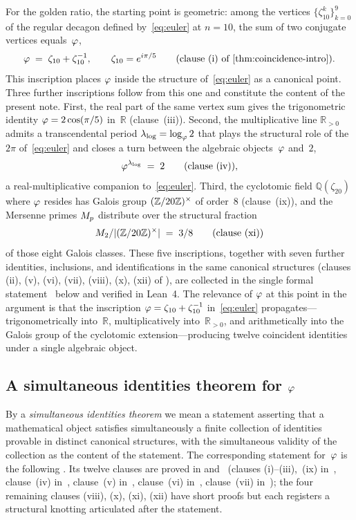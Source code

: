For the golden ratio, the starting point is geometric: among the
vertices $\{\zeta_{10}^{k}\}_{k=0}^{9}$ of the regular decagon
defined by~\eqref{eq:euler} at $n=10$, the sum of two conjugate
vertices equals~$\varphi$,
\[
  \golden \;=\; \zeta_{10}+\zeta_{10}^{-1}, \qquad \zeta_{10}=e^{i\pi/5}
  \qquad\text{(clause (i) of \Cref{thm:coincidence-intro})}.
\]
This inscription places $\varphi$ inside the structure
of~\eqref{eq:euler} as a canonical point.  Three further inscriptions
follow from this one and constitute the content of the present note.
First, the real part of the same vertex sum gives the trigonometric
identity $\varphi = 2\cos(\pi/5)$ in~$\mathbb{R}$ (clause~(iii)).
Second, the multiplicative line $\mathbb{R}_{>0}$ admits a
transcendental period $\lambda_{\log}=\log_{\varphi}2$ that plays the
structural role of the $2\pi$ of~\eqref{eq:euler} and closes a turn
between the algebraic objects~$\varphi$ and~$2$,
\[
  \varphi^{\lambda_{\log}} \;=\; 2 \qquad\text{(clause (iv))},
\]
a real-multiplicative companion to~\eqref{eq:euler}.  Third, the
cyclotomic field $\mathbb{Q}(\zeta_{20})$ where $\varphi$ resides has
Galois group $(\mathbb{Z}/20\mathbb{Z})^{\times}$ of order~$8$ (clause~(ix)), and the Mersenne
primes $M_{p}$ distribute over the structural fraction
\[
  M_{2}/|(\mathbb{Z}/20\mathbb{Z})^{\times}| \;=\; 3/8 \qquad\text{(clause (xi))}
\]
of those eight Galois classes.  These five inscriptions, together
with seven further identities, inclusions, and identifications in the
same canonical structures (clauses (ii), (v), (vi), (vii), (viii),
(x), (xii) of ), are collected in the
single formal statement~ below and
verified in Lean~4.  The relevance of $\varphi$ at this point in the
argument is that the inscription $\varphi=\zeta_{10}+\zeta_{10}^{-1}$
in~\eqref{eq:euler} propagates---trigonometrically into~$\mathbb{R}$,
multiplicatively into~$\mathbb{R}_{>0}$, and arithmetically into the
Galois group of the cyclotomic extension---producing twelve coincident
identities under a single algebraic object.

\subsection{A simultaneous identities theorem for
\texorpdfstring{$\varphi$}{phi}}\label{ssec:coincidence-intro}

By a \emph{simultaneous identities theorem} we mean a statement
asserting that a mathematical object satisfies simultaneously a
finite collection of identities provable in distinct canonical
structures, with the simultaneous validity of the collection as the
content of the statement.  The corresponding statement
for~$\varphi$ is the following .  Its
twelve clauses are proved in 
and~ (clauses (i)--(iii),~(ix)
in~, clause~(iv) in~, clause~(v)
in~, clause~(vi)
in~, clause~(vii)
in~); the four remaining clauses (viii), (x),
(xi), (xii) have short proofs but each registers a structural
knotting articulated after the statement.

